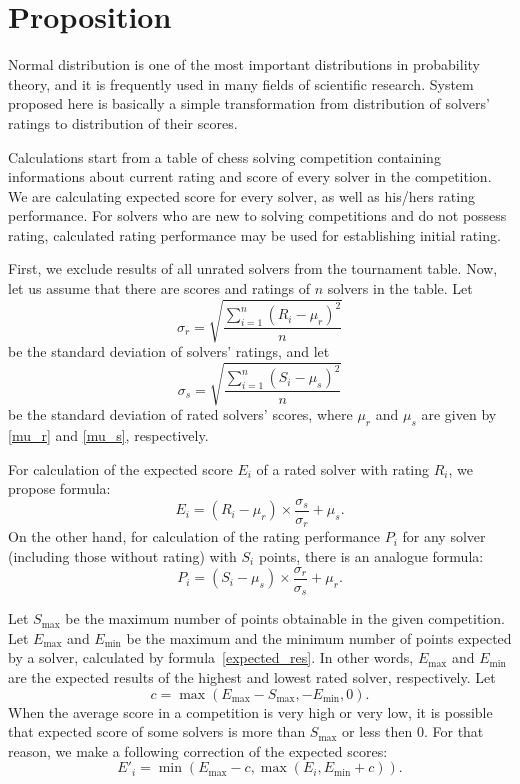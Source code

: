 \documentclass[preprint,12pt]{article}
\begin{document}
\section{Proposition}

Normal distribution is one of the most important distributions in
probability theory, and it is frequently used in many fields of scientific research.
System proposed here is basically a simple transformation
from distribution of solvers' ratings
to distribution of their scores.

Calculations start from a table of chess solving competition
containing informations about current rating and score of
every solver in the competition.
We are calculating expected score for every solver,
as well as his/hers rating performance.
For solvers who are new to solving competitions and do not possess rating,
calculated rating performance may be used for establishing initial rating.

First, we exclude results of all unrated solvers from the tournament table.
Now, let us assume that there are scores and ratings of $n$ solvers in the table.
Let
\begin{equation}\label{sigma_r}
\sigma_r = \sqrt{\frac{\sum_{i=1}^n (R_i - \mu_r)^2}{n}}
\end{equation}
be the standard deviation of solvers' ratings, and let
\begin{equation}\label{sigma_s}
\sigma_s = \sqrt{\frac{\sum_{i=1}^n (S_i - \mu_s)^2}{n}}
\end{equation}
be the standard deviation of rated solvers' scores,
where $\mu_r$ and $\mu_s$ are given by
\eqref{mu_r} and \eqref{mu_s}, respectively.

For calculation of the expected score $E_i$ of a rated solver with rating $R_i$,
we propose formula:
\begin{equation}\label{expected_res}
E_i = (R_i-\mu_r)\times \frac{\sigma_s}{\sigma_r}+\mu_s.
\end{equation}
On the other hand, for calculation of the rating performance $P_i$ for any solver
(including those without rating) with $S_i$ points, there is an analogue formula:
\begin{equation}
P_i = (S_i-\mu_s)\times \frac{\sigma_r}{\sigma_s}+\mu_r.
\end{equation}

Let $S_{\max}$ be the maximum number of points obtainable in the given competition.
Let $E_{\max}$ and $E_{\min}$ be the maximum and the minimum
number of points expected by a solver,
calculated by formula~\eqref{expected_res}.
In other words, $E_{\max}$ and $E_{\min}$ are the expected results
of the highest and lowest rated solver, respectively.
Let 
\begin{equation}
c = \max(E_{\max}-S_{\max}, -E_{\min}, 0).
\end{equation}
When the average score in a competition is very high or very low,
it is possible that expected score of some solvers
is more than $S_{\max}$ or less then $0$.
For that reason, we make a following correction of the expected scores:
\begin{equation}
E'_i = \min (E_{\max}-c, \max(E_i, E_{\min}+c)).
\end{equation}
\end{document}
